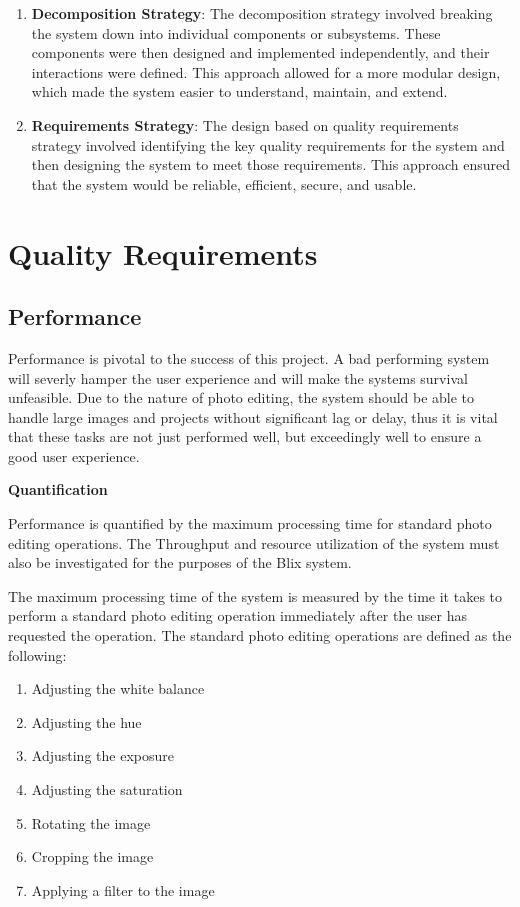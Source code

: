 \documentclass[11pt,a4paper]{article}
\begin{document}
\begin{enumerate}[label*=\arabic*.]
	\item[\textbullet] {\bf Decomposition Strategy}: The decomposition strategy
	involved breaking the system down into individual components or subsystems.
	These components were then designed and implemented independently, and their
	interactions were defined. This approach allowed for a more modular design,
	which made the system easier to understand, maintain, and extend.

	\item[\textbullet] {\bf Requirements Strategy}: The design based on quality
	requirements strategy involved identifying the key quality requirements for
	the system and then designing the system to meet those requirements. This
	approach ensured that the system would be reliable, efficient, secure, and
	usable.
\end{enumerate}

\section{Quality Requirements}
\subsection*{Performance}

Performance is pivotal to the success of this project. A bad performing system
will severly hamper the user experience and will make the systems survival unfeasible.
Due to the nature of photo editing, the system should be able to handle large
images and projects without significant lag or delay, thus it is vital that these tasks are 
not just performed well, but exceedingly well to ensure a good user experience.

{\bf Quantification}

Performance is quantified by the maximum processing time for standard photo editing operations.
The Throughput and resource utilization of the system must also be investigated for the purposes
of the Blix system.

The maximum processing time of the system is measured by the time it takes to perform a standard photo editing operation
immediately after the user has requested the operation. The standard photo editing operations are defined as the following:
\begin{enumerate}
    \item Adjusting the white balance
    \item Adjusting the hue
    \item Adjusting the exposure
    \item Adjusting the saturation
    \item Rotating the image
    \item Cropping the image
    \item Applying a filter to the image
\end{enumerate}
\end{document}
